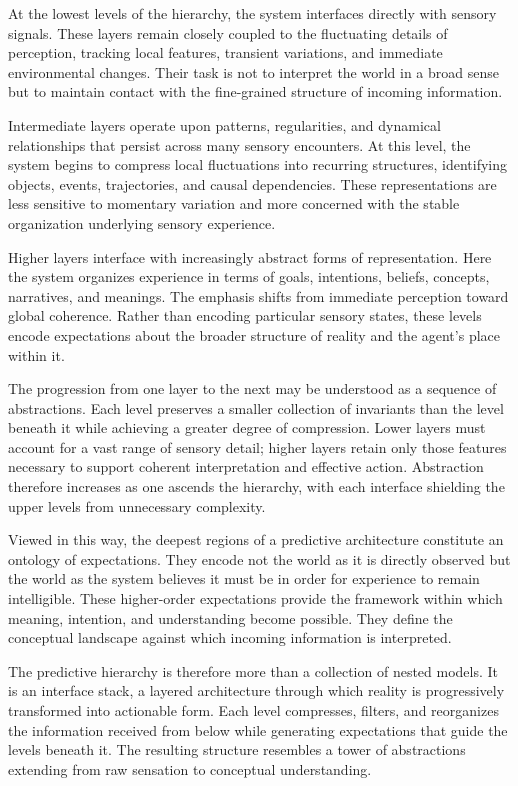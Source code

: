 \documentclass[12pt,letterpaper]{article}
\theoremstyle{remark}
\begin{document}
At the lowest levels of the hierarchy, the system interfaces directly with sensory signals. These layers remain closely coupled to the fluctuating details of perception, tracking local features, transient variations, and immediate environmental changes. Their task is not to interpret the world in a broad sense but to maintain contact with the fine-grained structure of incoming information.

Intermediate layers operate upon patterns, regularities, and dynamical relationships that persist across many sensory encounters. At this level, the system begins to compress local fluctuations into recurring structures, identifying objects, events, trajectories, and causal dependencies. These representations are less sensitive to momentary variation and more concerned with the stable organization underlying sensory experience.

Higher layers interface with increasingly abstract forms of representation. Here the system organizes experience in terms of goals, intentions, beliefs, concepts, narratives, and meanings. The emphasis shifts from immediate perception toward global coherence. Rather than encoding particular sensory states, these levels encode expectations about the broader structure of reality and the agent's place within it.

The progression from one layer to the next may be understood as a sequence of abstractions. Each level preserves a smaller collection of invariants than the level beneath it while achieving a greater degree of compression. Lower layers must account for a vast range of sensory detail; higher layers retain only those features necessary to support coherent interpretation and effective action. Abstraction therefore increases as one ascends the hierarchy, with each interface shielding the upper levels from unnecessary complexity.

Viewed in this way, the deepest regions of a predictive architecture constitute an ontology of expectations. They encode not the world as it is directly observed but the world as the system believes it must be in order for experience to remain intelligible. These higher-order expectations provide the framework within which meaning, intention, and understanding become possible. They define the conceptual landscape against which incoming information is interpreted.

The predictive hierarchy is therefore more than a collection of nested models. It is an interface stack, a layered architecture through which reality is progressively transformed into actionable form. Each level compresses, filters, and reorganizes the information received from below while generating expectations that guide the levels beneath it. The resulting structure resembles a tower of abstractions extending from raw sensation to conceptual understanding.
\end{document}
